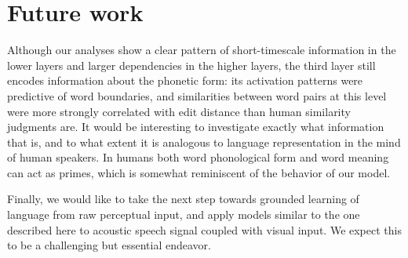
\section{Future work}
Although our analyses show a clear pattern of short-timescale
information in the lower layers and larger dependencies in the higher
layers, the third layer still encodes information about the phonetic
form: its activation patterns were predictive of word boundaries, and
similarities between word pairs at this level were more strongly
correlated with edit distance than human similarity judgments are. It
would be interesting to investigate exactly what information that is,
and to what extent it is analogous to language representation in the
mind of human speakers. In humans both word phonological form and word
meaning can act as primes, which is somewhat reminiscent of the
behavior of  our model. 

Finally, we would like to take the next step towards grounded learning of language from raw perceptual input, and apply models similar to the one described here to acoustic speech signal coupled with visual input. We expect this to be a challenging but essential endeavor.

